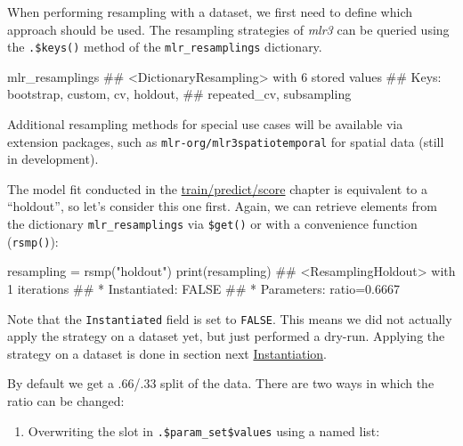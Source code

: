 \documentclass[
  11pt,
  parskip=half,
  DIV=calc,
  BCOR=10mm,
  x11names]{scrbook}
\newenvironment{Shaded}{}{}
\newcommand{\KeywordTok}[1]{\textcolor[rgb]{0.00,0.00,1.00}{#1}}
\newcommand{\NormalTok}[1]{#1}
\newcommand{\StringTok}[1]{\textcolor[rgb]{0.00,0.50,0.50}{#1}}
\providecommand{\tightlist}{%
  \setlength{\itemsep}{0pt}\setlength{\parskip}{0pt}}
\begin{document}
When performing resampling with a dataset, we first need to define which approach should be used.
The resampling strategies of \emph{mlr3} can be queried using the \texttt{.\$keys()} method of the \texttt{mlr\_resamplings} dictionary.

\begin{Shaded}
\begin{Highlighting}[]
\NormalTok{mlr_resamplings}
\NormalTok{## <DictionaryResampling> with 6 stored values}
\NormalTok{## Keys: bootstrap, custom, cv, holdout,}
\NormalTok{##   repeated_cv, subsampling}
\end{Highlighting}
\end{Shaded}

Additional resampling methods for special use cases will be available via extension packages, such as \texttt{mlr-org/mlr3spatiotemporal} for spatial data (still in development).

The model fit conducted in the \protect\hyperlink{train-predict}{train/predict/score} chapter is equivalent to a ``holdout'', so let's consider this one first.
Again, we can retrieve elements from the dictionary \texttt{mlr\_resamplings} via \texttt{\$get()} or with a convenience function (\texttt{rsmp()}):

\begin{Shaded}
\begin{Highlighting}[]
\NormalTok{resampling =}\StringTok{ }\KeywordTok{rsmp}\NormalTok{(}\StringTok{"holdout"}\NormalTok{)}
\KeywordTok{print}\NormalTok{(resampling)}
\NormalTok{## <ResamplingHoldout> with 1 iterations}
\NormalTok{## * Instantiated: FALSE}
\NormalTok{## * Parameters: ratio=0.6667}
\end{Highlighting}
\end{Shaded}

Note that the \texttt{Instantiated} field is set to \texttt{FALSE}.
This means we did not actually apply the strategy on a dataset yet, but just performed a dry-run.
Applying the strategy on a dataset is done in section next \protect\hyperlink{instantiation}{Instantiation}.

By default we get a .66/.33 split of the data.
There are two ways in which the ratio can be changed:

\begin{enumerate}
\def\labelenumi{\arabic{enumi}.}
\tightlist
\item
  Overwriting the slot in \texttt{.\$param\_set\$values} using a named list:
\end{enumerate}
\end{document}
